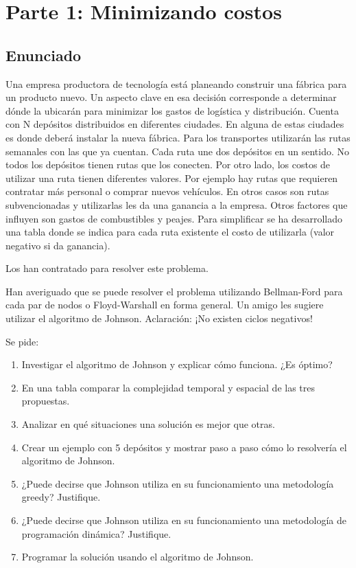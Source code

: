 \documentclass[titlepage,a4paper]{article}
\begin{document}
\newpage\section{Parte 1: Minimizando costos}\label{sec:parte1}

\subsection{Enunciado}

Una empresa productora de tecnología está planeando construir una fábrica para un
producto nuevo. Un aspecto clave en esa decisión corresponde a determinar dónde la
ubicarán para minimizar los gastos de logística y distribución. Cuenta con N depósitos
distribuidos en diferentes ciudades. En alguna de estas ciudades es donde deberá
instalar la nueva fábrica. Para los transportes utilizarán las rutas semanales con las
que ya cuentan. Cada ruta une dos depósitos en un sentido. No todos los depósitos
tienen rutas que los conecten. Por otro lado, los costos de utilizar una ruta tienen
diferentes valores. Por ejemplo hay rutas que requieren contratar más personal o
comprar nuevos vehículos. En otros casos son rutas subvencionadas y utilizarlas les
da una ganancia a la empresa. Otros factores que influyen son gastos de combustibles
y peajes. Para simplificar se ha desarrollado una tabla donde se indica para cada
ruta existente el costo de utilizarla (valor negativo si da ganancia).

Los han contratado para resolver este problema.

Han averiguado que se puede resolver el problema utilizando Bellman-Ford para cada
par de nodos o Floyd-Warshall en forma general. Un amigo les sugiere utilizar el
algoritmo de Johnson. Aclaración: ¡No existen ciclos negativos!

\noindent Se pide:

\begin{enumerate}
    \item Investigar el algoritmo de Johnson y explicar cómo funciona. ¿Es óptimo?
    \item En una tabla comparar la complejidad temporal y espacial de las tres propuestas.
    \item Analizar en qué situaciones una solución es mejor que otras.
    \item Crear un ejemplo con 5 depósitos y mostrar paso a paso cómo lo resolvería el algoritmo de Johnson.
    \item ¿Puede decirse que Johnson utiliza en su funcionamiento una metodología greedy? Justifique.
    \item ¿Puede decirse que Johnson utiliza en su funcionamiento una metodología de programación dinámica? Justifique.
    \item Programar la solución usando el algoritmo de Johnson.
\end{enumerate}
\end{document}
